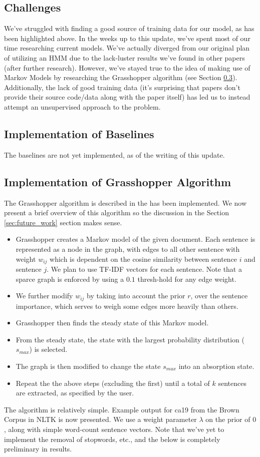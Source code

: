 \documentclass[10pt]{article}
\begin{document}
\subsection{Challenges}
\label{sec:challenges}
We've struggled with finding a good source of training data for our model, as has been highlighted above. In the weeks up to this update, we've spent most of our time researching current models. We've actually diverged from our original plan of utilizing an HMM due to the lack-luster results we've found in other papers (after further research). However, we've stayed true to the idea of making use of Markov Models by researching the Grasshopper algorithm (see Section \ref{sec:grasshopper}). Additionally, the lack of good training data (it's surprising that papers don't provide their source code/data along with the paper itself) has led us to instead attempt an unsupervised approach to the problem.

\subsection{Implementation of Baselines}
\label{sec:baseline}
The baselines are not yet implemented, as of the writing of this update.

\subsection{Implementation of Grasshopper Algorithm}
\label{sec:grasshopper}
The Grasshopper algorithm is described in the \cite{grasshopper} has been implemented. We now present a brief overview of this algorithm so the discussion in the Section \ref{sec:future_work} section makes sense.
\begin{itemize}
\item Grasshopper creates a Markov model of the given document. Each sentence is represented as a node in the graph, with edges to all other sentence with weight $w_{ij}$ which is dependent on the cosine similarity between sentence $i$ and sentence $j$. We plan to use TF-IDF vectors for each sentence. Note that a sparce graph is enforced by using a $0.1$ thresh-hold for any edge weight.
\item We further modify $w_{ij}$ by taking into account the prior $r$, over the sentence importance, which serves to weigh some edges more heavily than others.
\item Grasshopper then finds the steady state of this Markov model.
\item From the steady state, the state with the largest probability distribution ($s_{max}$) is selected.
\item The graph is then modified to change the state $s_{max}$ into an absorption state.
\item Repeat the the above steps (excluding the first) until a total of $k$ sentences are extracted, as specified by the user.
\end{itemize}
The algorithm is relatively simple. Example output for ca19 from the Brown Corpus in NLTK is now presented. We use a weight parameter $\lambda$ on the prior of $0$, along with simple word-count sentence vectors. Note that we've yet to implement the removal of stopwords, etc., and the below is completely preliminary in results.
\end{document}
